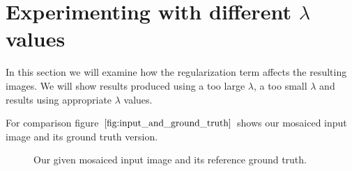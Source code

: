 \documentclass{paper}
\begin{document}
\section{Experimenting with different $\lambda$ values}
In this section we will examine how the regularization term affects the resulting images. We will show results produced using a too large $\lambda$, a too small $\lambda$ and results using appropriate $\lambda$ values.

For comparison figure $\ref{fig:input_and_ground_truth}$ shows our mosaiced input image and its ground truth version.

\begin{figure}[H]
\begin{center}

\end{center}
\caption{Our given mosaiced input image and its reference ground truth.}
\label{fig:input_and_ground_truth}
\end{figure}
\end{document}
